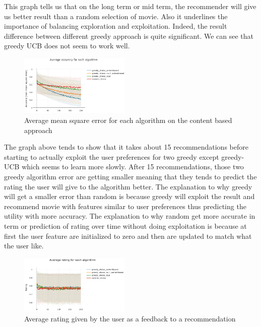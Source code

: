 \documentclass[letterpaper]{article}
\begin{document}
This graph tells us that on the long term or mid term, the recommender will give us better result than a random selection of movie. Also it underlines the importance of balancing exploration and exploitation. Indeed, the result difference between different greedy approach is quite significant. We can see that greedy UCB does not seem to work well.

\begin{figure}[H]
\begin{center}
\includegraphics[width=0.47\textwidth]{img/greedy1.png}
\caption{Average mean square error for each algorithm on the content based approach}
\label{greedy1}
\end{center}
\end{figure}

The graph above tends to show that it takes about 15 recommendations before starting to actually exploit the user preferences for two greedy except greedy-UCB which seems to learn more slowly. After 15 recommendations, those two greedy algorithm error are getting smaller meaning that they tends to predict the rating the user will give to the algorithm better.
The explanation to why greedy will get a smaller error than random is because greedy will exploit the result and recommend movie with features similar to user preferences thus predicting the utility with more accuracy.
The explanation to why random get more accurate in term or prediction of rating over time without doing exploitation is because at first the user feature are initialized to zero and then are updated to match what the user like.

\begin{figure}[H]
\begin{center}
\includegraphics[width=0.47\textwidth]{img/greedy2.png}
\caption{Average rating given by the user as a feedback to a recommendation}
\label{schema2}
\end{center}
\end{figure}
\end{document}
